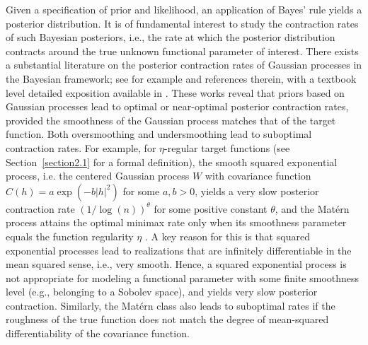 \documentclass[ejs,noshowframe]{imsart}
\theoremstyle{plain}
\theoremstyle{definition}
\theoremstyle{remark}
\begin{document}
 
Given a specification of prior and likelihood, an application of Bayes' rule  yields a posterior distribution. It is of fundamental interest to study the contraction rates of such Bayesian posteriors, i.e., the rate at which the posterior distribution contracts around the true unknown functional parameter of interest.
There exists a substantial literature on the posterior contraction rates of Gaussian processes in the Bayesian framework; see for example \citet{van2007bayesian,van2008rates,van2011information,castillo2008lower,castillo2014bayesian,giordano2020consistency,nickl2017nonparametric, nickl2023bayesian,pati2015optimal,van2016gaussian} and references therein, with a textbook level detailed exposition available in \citet{ghosal2017fundamentals}. These works  reveal that priors based on Gaussian processes lead to optimal or near-optimal posterior contraction rates, provided the smoothness of  the Gaussian process matches that of the target function. Both oversmoothing and undersmoothing lead to suboptimal contraction rates. For example, for  $\eta$-regular  target functions (see Section~\ref{section2.1} for a formal definition), the smooth  squared exponential process, i.e. the centered Gaussian process $W$ with covariance function $C(h)=a \exp(-b |h|^2)$ for some $a,b>0$, yields a very slow posterior contraction rate $(1/\log(n))^{\theta}$ for some positive constant $\theta$, and the Mat\'ern process attains the optimal minimax rate only when its smoothness parameter equals the function regularity $\eta$  \citep{van2011information}. A key reason for this is that squared exponential processes lead to realizations that are infinitely differentiable in the mean squared sense, i.e., very smooth. Hence, a squared exponential process  is not appropriate for modeling a functional parameter with some finite smoothness level (e.g., belonging to a Sobolev space), and yields  very slow posterior contraction. Similarly, the Mat\'ern class also leads to suboptimal rates if the roughness of the true function does not match the degree of mean-squared differentiability of the covariance function.
\end{document}
